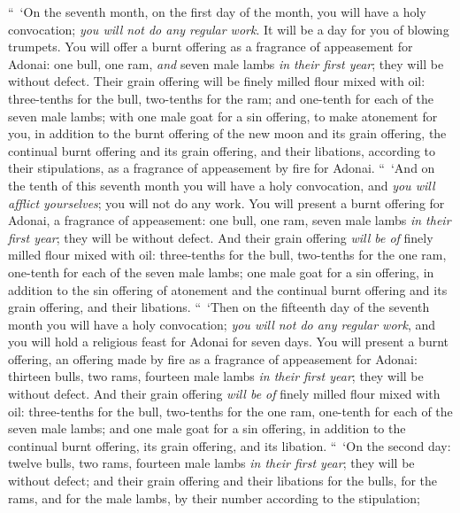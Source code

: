 \begin{biblechapter} %
 “ ‘On the seventh month, on the first day of the month, you will have a holy convocation; \textit{you will not do any regular work}. It will be a day for you of blowing trumpets.
\verse You will offer a burnt offering as a fragrance of appeasement for Adonai: one bull, one ram, \textit{and} seven male lambs \textit{in their first year}; they will be without defect.
\verse Their grain offering will be finely milled flour mixed with oil: three-tenths for the bull, two-tenths for the ram;
\verse and one-tenth for each of the seven male lambs;
\verse with one male goat for a sin offering, to make atonement for you,
\verse in addition to the burnt offering of the new moon and its grain offering, the continual burnt offering and its grain offering, and their libations, according to their stipulations, as a fragrance of appeasement by fire for Adonai.
 “ ‘And on the tenth of this seventh month you will have a holy convocation, and \textit{you will afflict yourselves}; you will not do any work.
\verse You will present a burnt offering for Adonai, a fragrance of appeasement: one bull, one ram, seven male lambs \textit{in their first year}; they will be without defect.
\verse And their grain offering \textit{will be of} finely milled flour mixed with oil: three-tenths for the bull, two-tenths for the one ram,
\verse one-tenth for each of the seven male lambs;
\verse one male goat for a sin offering, in addition to the sin offering of atonement and the continual burnt offering and its grain offering, and their libations.
\verse “ ‘Then on the fifteenth day of the seventh month you will have a holy convocation; \textit{you will not do any regular work}, and you will hold a religious feast for Adonai for seven days.
\verse You will present a burnt offering, an offering made by fire as a fragrance of appeasement for Adonai: thirteen bulls, two rams, fourteen male lambs \textit{in their first year}; they will be without defect.
\verse And their grain offering \textit{will be of} finely milled flour mixed with oil: three-tenths for the bull, two-tenths for the one ram,
\verse one-tenth for each of the seven male lambs;
\verse and one male goat for a sin offering, in addition to the continual burnt offering, its grain offering, and its libation.
\verse “ ‘On the second day: twelve bulls, two rams, fourteen male lambs \textit{in their first year}; they will be without defect;
\verse and their grain offering and their libations for the bulls, for the rams, and for the male lambs, by their number according to the stipulation;

\end{biblechapter}
